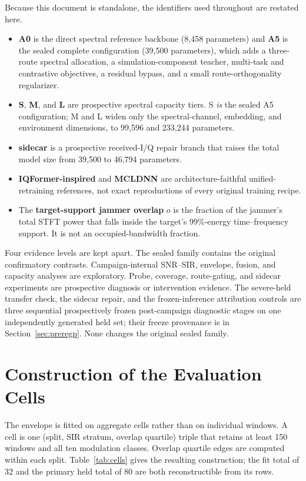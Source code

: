 \documentclass[letterpaper,onecolumn,11pt,journal]{IEEEtran}
\begin{document}
Because this document is standalone, the identifiers used throughout are
restated here.
\begin{itemize}
  \item \textbf{A0} is the direct spectral reference backbone (8{,}458
  parameters) and \textbf{A5} is the sealed complete configuration
  (39{,}500 parameters), which adds a three-route spectral allocation, a
  simulation-component teacher, multi-task and contrastive objectives, a
  residual bypass, and a small route-orthogonality regularizer.
  \item \textbf{S}, \textbf{M}, and \textbf{L} are prospective spectral
  capacity tiers. S \emph{is} the sealed A5 configuration; M and L widen only
  the spectral-channel, embedding, and environment dimensions, to
  99{,}596 and 233{,}244 parameters.
  \item \textbf{sidecar} is a prospective received-I/Q repair branch that
  raises the total model size from 39{,}500 to 46{,}794 parameters.
  \item \textbf{IQFormer-inspired} and \textbf{MCLDNN} are
  architecture-faithful unified-retraining references, not exact reproductions
  of every original training recipe.
  \item The \textbf{target-support jammer overlap} $o$ is the fraction of the
  jammer's total STFT power that falls inside the target's 99\%-energy
  time--frequency support. It is not an occupied-bandwidth fraction.
\end{itemize}

Four evidence levels are kept apart. The sealed family contains the original
confirmatory contrasts. Campaign-internal SNR--SIR, envelope, fusion, and
capacity analyses are exploratory. Probe, coverage, route-gating, and sidecar
experiments are prospective diagnosis or intervention evidence. The severe-held
transfer check, the sidecar repair, and the frozen-inference attribution
controls are three sequential prospectively frozen post-campaign diagnostic
stages on one independently generated held set; their freeze provenance is in
Section~\ref{sec:preregp}. None changes the original sealed family.

\section{Construction of the Evaluation Cells}
The envelope is fitted on aggregate cells rather than on individual windows. A
cell is one (split, SIR stratum, overlap quartile) triple that retains at least
150 windows and all ten modulation classes. Overlap quartile edges are computed
within each split. Table~\ref{tab:cells} gives the resulting construction; the
fit total of 32 and the primary held total of 80 are both reconstructible from
its rows.
\end{document}
